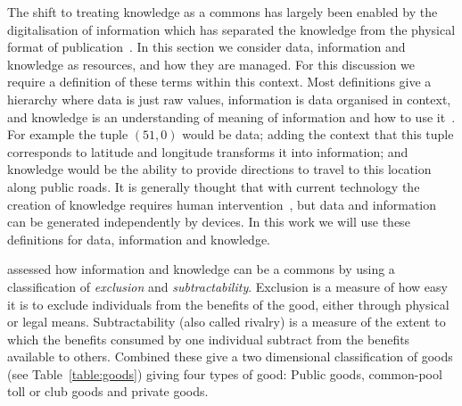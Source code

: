The shift to treating knowledge as a commons has largely been enabled by the digitalisation of information which has separated the knowledge from the physical format of publication~\citep{Ostrom2003}. 
In this section we consider data, information and knowledge as resources, and how they are managed. 
For this discussion we require a definition of these terms within this context.
Most definitions give a hierarchy where data is just raw values, information is data organised in context, and knowledge is an understanding of meaning of information and how to use it~\citep{Machlup1983,Davenport2000,Shadbolt2013}. For example the tuple $(51,0)$ would be data; adding the context that this tuple corresponds to latitude and longitude transforms it into information; and knowledge would be the ability to provide directions to travel to this location along public roads. It is generally thought that with current technology the creation of knowledge requires human intervention~\citep{Davenport2000}, but data and information can be generated independently by devices. In this work we will use these definitions for data, information and knowledge.

\citet{Ostrom2003} assessed how information and knowledge can be a commons by using a classification of \emph{exclusion} and \emph{subtractability}. 
Exclusion is a measure of how easy it is to exclude individuals from the benefits of the good, either through physical or legal means. 
Subtractability (also called rivalry) is a measure of the extent to which the benefits consumed by one individual subtract from the benefits available to others. 
Combined these give a two dimensional classification of goods (see Table~\ref{table:goods}) giving four types of good: Public goods, common-pool toll or club goods and private goods.


